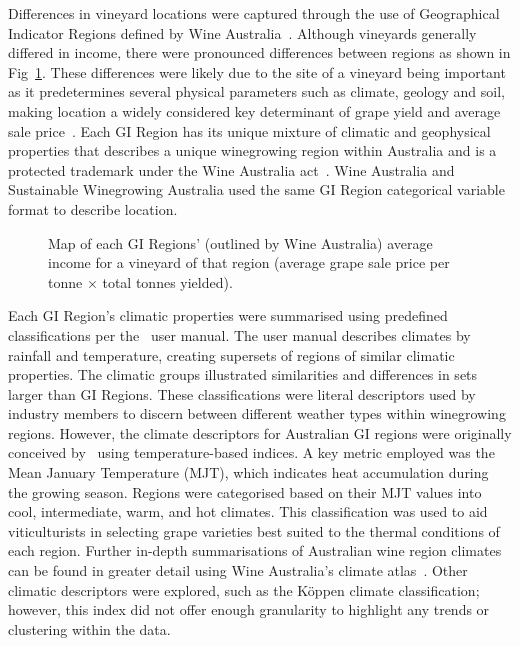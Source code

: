\documentclass[10pt,letterpaper]{article}
\begin{document}
\par
Differences in vineyard locations were captured through the use of Geographical Indicator Regions defined by Wine Australia~\cite{hallidayAustralianWineEncyclopedia2009,oliverReviewSoilPhysical2013,soarClimateDriversRed2008}. Although vineyards generally differed in income, there were pronounced differences between regions as shown in Fig~\ref{fig:map}. These differences were likely due to the site of a vineyard being important as it predetermines several physical parameters such as climate, geology and soil, making location a widely considered key determinant of grape yield and average sale price~\cite{abbalDecisionSupportSystem2016,agostaRegionalClimateVariability2012,fragaMultivariateClusteringViticultural2017}. Each GI Region has its unique mixture of climatic and geophysical properties that describes a unique winegrowing region within Australia and is a protected trademark under the Wine Australia act~\cite{attorney-generalsdepartmentWineAustraliaCorporation2010}. Wine Australia and Sustainable Winegrowing Australia used the same GI Region categorical variable format to describe location.

\begin{figure}[htb]
  \caption{Map of each GI Regions' (outlined by Wine Australia) average income for a vineyard of that region (average grape sale price per tonne $\times$ total tonnes yielded).}\label{fig:map}
\end{figure}%

\par
 Each GI Region's climatic properties were summarised using predefined classifications per the~\cite{sustainablewinegrowingaustraliaSustainableWinegrowingAustralia2021} user manual. The user manual describes climates by rainfall and temperature, creating supersets of regions of similar climatic properties. The climatic groups illustrated similarities and differences in sets larger than GI Regions.
These classifications were literal descriptors used by industry members to discern between different weather types within winegrowing regions. However, the climate descriptors for Australian GI regions were originally conceived by~\cite{gladstones_climate_2010} using temperature-based indices. A key metric employed was the Mean January Temperature (MJT), which indicates heat accumulation during the growing season. Regions were categorised based on their MJT values into cool, intermediate, warm, and hot climates. This classification was used to aid viticulturists in selecting grape varieties best suited to the thermal conditions of each region. Further in-depth summarisations of Australian wine region climates can be found in greater detail using Wine Australia's climate atlas~\cite{remenyi_australias_2019}. Other climatic descriptors were explored, such as the  Köppen climate classification; however, this index did not offer enough granularity to highlight any trends or clustering within the data.
\par
\end{document}
